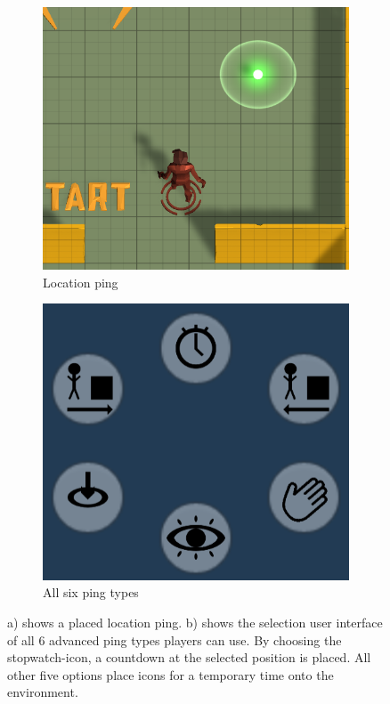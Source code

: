 \begin{figure}[h!]
    \centering
    \begin{subfigure}[b]{0.4\linewidth}
        \includegraphics[width=\linewidth]{images/location_ping.png}
        \caption{Location ping}
        \label{fig:location ping}
      \end{subfigure}
    \begin{subfigure}[b]{0.4\linewidth}
        \includegraphics[width=\linewidth]{images/ping_types.png}
        \caption{All six ping types}
        \label{fig:ping types}
    \end{subfigure}
    \caption{ a) shows a placed location ping. 
    b) shows the selection user interface of all 6 advanced ping types players can use. By choosing the stopwatch-icon, a countdown at the selected position is placed. All other five options place icons for a temporary time onto the environment.}
\end{figure}

